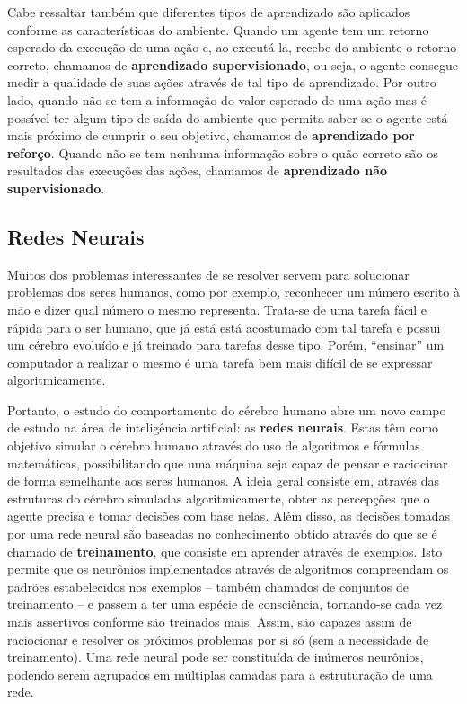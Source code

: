 Cabe ressaltar também que diferentes tipos de aprendizado são aplicados conforme
as características do ambiente. Quando um agente tem um retorno esperado da
execução de uma ação e, ao executá-la, recebe do ambiente o retorno correto,
chamamos de \textbf{aprendizado supervisionado}, ou seja, o agente consegue
medir a qualidade de suas ações através de tal tipo de aprendizado. Por outro
lado, quando não se tem a informação do valor esperado de uma ação mas é
possível ter algum tipo de saída do ambiente que permita saber se o agente está
mais próximo de cumprir o seu objetivo, chamamos de \textbf{aprendizado por
reforço}. Quando não se tem nenhuma informação sobre o quão correto são os
resultados das execuções das ações, chamamos de \textbf{aprendizado não
supervisionado}. \cite{Russell:1995:AIM:193191}

\subsection{Redes Neurais}

Muitos dos problemas interessantes de se resolver servem para solucionar
problemas dos seres humanos, como por exemplo, reconhecer um número escrito à
mão e dizer qual número o mesmo representa. Trata-se de uma tarefa fácil e
rápida para o ser humano, que já está está acostumado com tal tarefa e possui
um cérebro evoluído e já treinado para tarefas desse tipo. Porém, ``ensinar'' um
computador a realizar o mesmo é uma tarefa bem mais difícil de se expressar
algoritmicamente.

Portanto, o estudo do comportamento do cérebro humano abre um novo campo de
estudo na área de inteligência artificial: as \textbf{redes neurais}. Estas têm
como objetivo simular o cérebro humano através do uso de algoritmos e fórmulas
matemáticas, possibilitando que uma máquina seja capaz de pensar e raciocinar de
forma semelhante aos seres humanos. A ideia geral consiste em, através das
estruturas do cérebro simuladas algoritmicamente, obter as percepções que o
agente precisa e tomar decisões com base nelas. Além disso, as decisões tomadas
por uma rede neural são baseadas no conhecimento obtido através do que se é
chamado de \textbf{treinamento}, que consiste em aprender através de exemplos.
Isto permite que os neurônios implementados através de algoritmos compreendam os
padrões estabelecidos nos exemplos -- também chamados de conjuntos de
treinamento -- e passem a ter uma espécie de consciência, tornando-se cada vez
mais assertivos conforme são treinados mais. Assim, são capazes assim de
raciocionar e resolver os próximos problemas por si só (sem a necessidade de
treinamento). Uma rede neural pode ser constituída de inúmeros neurônios,
podendo serem agrupados em múltiplas camadas para a estruturação de uma rede.

